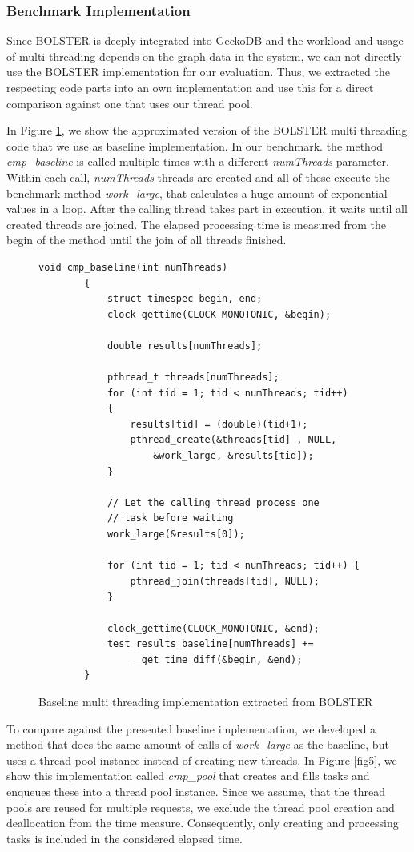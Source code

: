 \documentclass[conference]{IEEEtran}
\begin{document}
\subsubsection{Benchmark Implementation}
Since BOLSTER is deeply integrated into GeckoDB and the workload and usage of multi threading depends on the graph data in the system, we can not directly use the BOLSTER implementation for our evaluation. Thus, we extracted the respecting code parts into an own implementation and use this for a direct comparison against one that uses our thread pool. 

In Figure \ref{fig4}, we show the approximated version of the BOLSTER multi threading code that we use as baseline implementation. In our benchmark. the method \emph{cmp\_baseline} is called multiple times with a different \emph{numThreads} parameter. Within each call, \emph{numThreads} threads are created and all of these execute the benchmark method \emph{work\_large}, that calculates a huge amount of exponential values in a loop. After the calling thread takes part in execution, it waits until all created threads are joined. The elapsed processing time is measured from the begin of the method until the join of all threads finished.

\begin{figure}
	\begin{lstlisting}[style=CStyle]
		void cmp_baseline(int numThreads)
		{
			struct timespec begin, end;
			clock_gettime(CLOCK_MONOTONIC, &begin);
			
			double results[numThreads];
			
			pthread_t threads[numThreads];
			for (int tid = 1; tid < numThreads; tid++)
			{
				results[tid] = (double)(tid+1);
				pthread_create(&threads[tid] , NULL, 
					&work_large, &results[tid]);
			}
			
			// Let the calling thread process one 
			// task before waiting
			work_large(&results[0]);
			
			for (int tid = 1; tid < numThreads; tid++) {
				pthread_join(threads[tid], NULL);
			}
			
			clock_gettime(CLOCK_MONOTONIC, &end);
			test_results_baseline[numThreads] +=
				__get_time_diff(&begin, &end);
		}
	\end{lstlisting}
	\caption{Baseline multi threading implementation extracted from BOLSTER}
	\label{fig4}
\end{figure}

To compare against the presented baseline implementation, we developed a method that does the same amount of calls of \emph{work\_large} as the baseline, but uses a thread pool instance instead of creating new threads. In Figure \ref{fig5}, we show this implementation called \emph{cmp\_pool} that creates and fills tasks and enqueues these into a thread pool instance. Since we assume, that the thread pools are reused for multiple requests, we exclude the thread pool creation and deallocation from the time measure. Consequently, only creating and processing tasks is included in the considered elapsed time. 
\end{document}
